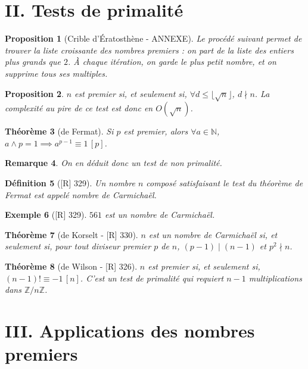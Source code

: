 \documentclass[10pt, a4paper, parskip=full, twoside, twocolumn]{report}
\newtheorem{definition}{Définition}
\newtheorem{theorem}[definition]{Théorème}
\newtheorem{proposition}[definition]{Proposition}
\newtheorem{example}[definition]{Exemple}
\newtheorem{remark}[definition]{Remarque}
\newcommand{\IN}{\mathbb{N}}
\newcommand{\IZnZ}{\mathbb{Z}/n\mathbb{Z}}
\begin{document}
\section*{II. Tests de primalité}

\begin{proposition}[Crible d'Ératosthène - ANNEXE]
	Le procédé suivant permet de trouver la liste croissante des nombres premiers : on part de la liste des entiers plus grands que $2$. À chaque itération,
	on garde le plus petit nombre, et on supprime tous ses multiples.
\end{proposition}

\begin{proposition}
	$n$ est premier si, et seulement si, $\forall d\leq \lfloor\sqrt{n}\rfloor$, $d\nmid n$.
	La complexité au pire de ce test est donc en $O(\sqrt{n})$.
\end{proposition}

\begin{theorem}[de Fermat]
	Si $p$ est premier, alors $\forall a\in \IN$, $a\wedge p=1\implies a^{p-1} \equiv 1\,[p]$.
\end{theorem}

\begin{remark}
	On en déduit donc un test de non primalité.
\end{remark}

\begin{definition}[\textnormal{[R] 329}]
	Un nombre $n$ composé satisfaisant le test du théorème de Fermat est appelé \emph{nombre de Carmichaël}.
\end{definition}

\begin{example}[\textnormal{[R] 329}]
	$561$ est un nombre de Carmichaël.
\end{example}

\begin{theorem}[de Korselt - \textnormal{[R] 330}]
	$n$ est un nombre de Carmichaël si, et seulement si, pour tout diviseur premier $p$ de $n$, $(p-1)\mid(n-1)$ et $p^2\nmid n$.
\end{theorem}

\begin{theorem}[de Wilson - \textnormal{[R] 326}]
	$n$ est premier si, et seulement si, $(n-1)!\equiv -1\,[n]$.
	C'est un test de primalité qui requiert $n-1$ multiplications dans $\IZnZ$.
\end{theorem}

\section*{III. Applications des nombres premiers}
\end{document}
